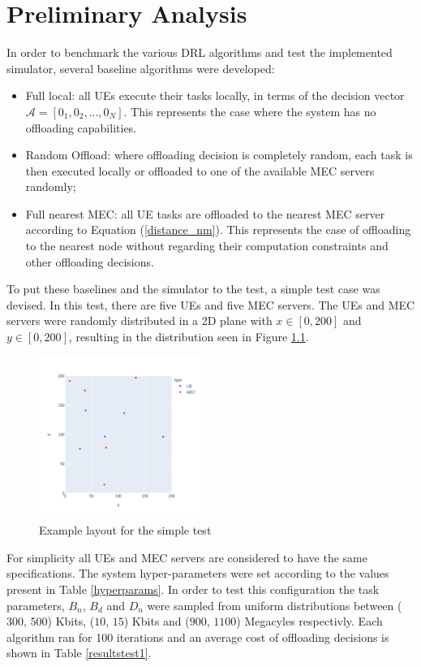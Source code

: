 \chapter{Preliminary Analysis}

\noindent In order to benchmark the various \acrshort{DRL} algorithms and test the implemented simulator, several baseline algorithms were developed:

\begin{itemize}
    \item Full local: all \acrshort{UE}s execute their tasks locally, in terms of the decision vector $\mathcal{A}=[0_1, 0_2, ..., 0_N]$. This represents the case where the system has no offloading capabilities.
    \item Random Offload: where offloading decision is completely random, each task is then executed locally or offloaded to one of the available \acrshort{MEC} servers randomly;
    \item Full nearest \acrshort{MEC}: all \acrshort{UE} tasks are offloaded to the nearest \acrshort{MEC} server according to Equation (\ref{distance_nm}). This represents the case of offloading to the nearest node without regarding their computation constraints and other offloading decisions.
\end{itemize}

To put these baselines and the simulator to the test, a simple test case was devised. In this test, there are five \acrshort{UE}s and five \acrshort{MEC} servers. The UEs and MEC servers were randomly distributed in a 2D plane with $x \in [0, 200]$ and $y \in [0, 200]$, resulting in the distribution seen in Figure \ref{example_layout}.

\begin{figure}[h]
  \centering
  \includegraphics[width=200px]{images/example_layout.png}
  \caption{Example layout for the simple test}  \label{example_layout}
\end{figure}

For simplicity all \acrshort{UE}s and \acrshort{MEC} servers are considered to have the same specifications. The system hyper-parameters were set according to the values present in Table \ref{hyperparams}. In order to test this configuration the task parameters, $B_n$, $B_d$ and $D_n$ were sampled from uniform distributions between ($300$, $500$) Kbits, ($10$, $15$) Kbits and ($900$, $1100$) Megacyles respectivly. Each algorithm ran for 100 iterations and an average cost of offloading decisions is shown in Table \ref{resultstest1}.


